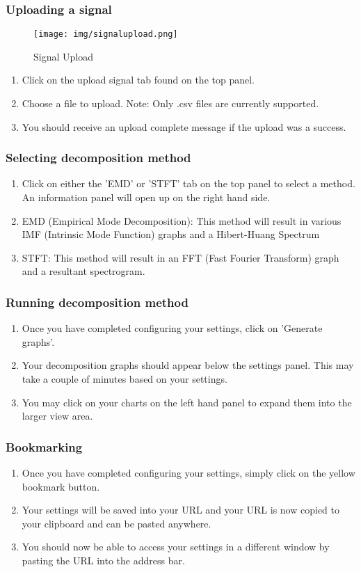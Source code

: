 \subsubsection{Uploading a signal}
\begin{figure}
\centering
\texttt{[image: img/signalupload.png]}
\caption{\label{fig:Signal Upload}Signal Upload}
\end{figure}

\begin{enumerate}
\item Click on the upload signal tab found on the top panel.
\item Choose a file to upload. Note: Only .csv files are currently supported.
\item You should receive an upload complete message if the upload was a success.
\end{enumerate}

\subsubsection{Selecting decomposition method}
\begin{enumerate}
\item Click on either the 'EMD' or 'STFT' tab on the top panel to select a method. An information panel will open up on the right hand side.
\item EMD (Empirical Mode Decomposition): This method will result in various IMF (Intrinsic Mode Function) graphs and a Hibert-Huang Spectrum  
\item STFT: This method will result in an FFT (Fast Fourier Transform) graph and a resultant spectrogram.
\end{enumerate}

\subsubsection{Running decomposition method}
\begin{enumerate}
\item Once you have completed configuring your settings, click on 'Generate graphs'.
\item Your decomposition graphs should appear below the settings panel. This may take a couple of minutes based on your settings.
\item You may click on your charts on the left hand panel to expand them into the larger view area.
\end{enumerate}

\subsubsection{Bookmarking}
\begin{enumerate}
\item Once you have completed configuring your settings, simply click on the yellow bookmark button.
\item Your settings will be saved into your URL and your URL is now copied to your clipboard and can be pasted anywhere.
\item You should now be able to access your settings in a different window by pasting the URL into the address bar.
\end{enumerate}
